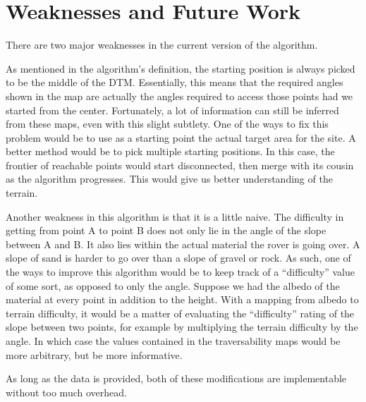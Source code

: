 \documentclass[12pt]{article}
\begin{document}
\section{Weaknesses and Future Work}
\label{sec:weaknesses_and_future_work}
\par There are two major weaknesses in the current version of the algorithm.
\par As mentioned in the algorithm's definition, the starting position is always picked to be the middle of the DTM. Essentially, this means that the required angles shown in the map are actually the angles required to access those points had we started from the center. Fortunately, a lot of information can still be inferred from these maps, even with this slight subtlety. One of the ways to fix this problem would be to use as a starting point the actual target area for the site. A better method would be to pick multiple starting positions. In this case, the frontier of reachable points would start disconnected, then merge with its cousin as the algorithm progresses. This would give us better understanding of the terrain.
\par Another weakness in this algorithm is that it is a little naive. The difficulty in getting from point A to point B does not only lie in the angle of the slope between A and B. It also lies within the actual material the rover is going over. A slope of sand is harder to go over than a slope of gravel or rock. As such, one of the ways to improve this algorithm would be to keep track of a ``difficulty'' value of some sort, as opposed to only the angle. Suppose we had the albedo of the material at every point in addition to the height. With a mapping from albedo to terrain difficulty, it would be a matter of evaluating the ``difficulty'' rating of the slope between two points, for example by multiplying the terrain difficulty by the angle. In which case the values contained in the traversability maps would be more arbitrary, but be more informative.
\par As long as the data is provided, both of these modifications are implementable without too much overhead.
\end{document}
